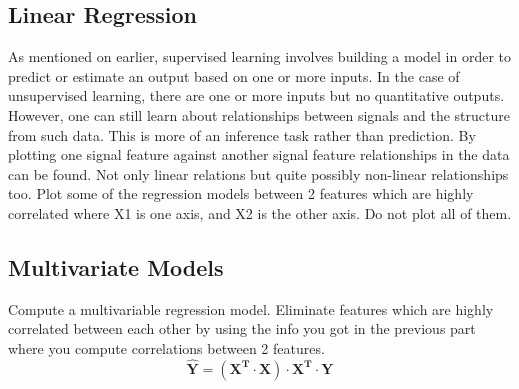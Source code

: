 \documentclass[]{article}
\begin{document}
\subsection{Linear Regression}
As mentioned on earlier, supervised learning involves building a model in order to predict or estimate an output based on one or more inputs. In the case of unsupervised learning, there are one or more inputs but no quantitative outputs. However, one can still learn about relationships between signals and the structure from such data. This is more of an inference task rather than prediction.
By plotting one signal feature against another signal feature relationships in the data can be found. Not only linear relations but quite possibly non-linear relationships too.
Plot some of the regression models between 2 features which are highly correlated where X1 is one axis, and X2 is the other axis. Do not plot all of them.
\subsection{Multivariate Models}
Compute a multivariable regression model.
Eliminate features which are highly correlated between each other by using the info you got in the previous part where you compute correlations between 2 features.
$$ \mathbf{\hat{Y} = (X^T \cdot X) \cdot X^T \cdot Y } $$
\end{document}
